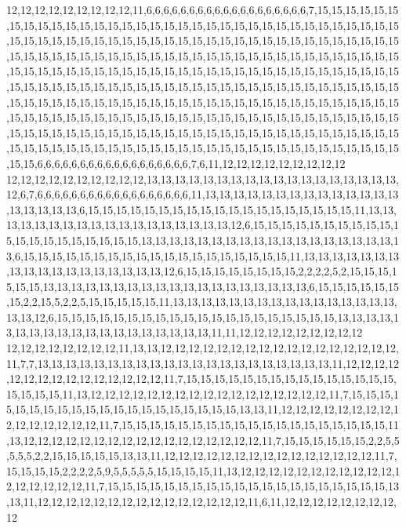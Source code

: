 12,12,12,12,12,12,12,12,12,11,6,6,6,6,6,6,6,6,6,6,6,6,6,6,6,6,6,6,6,7,15,15,15,15,15,15,15,15,15,15,15,15,15,15,15,15,15,15,15,15,15,15,15,15,15,15,15,15,15,15,15,15,15,15,15,15,15,15,15,15,15,15,15,15,15,15,15,15,15,15,15,15,15,15,15,15,15,15,15,15,15,15,15,15,15,15,15,15,15,15,15,15,15,15,15,15,15,15,15,15,15,15,15,15,15,15,15,15,15,15,15,15,15,15,15,15,15,15,15,15,15,15,15,15,15,15,15,15,15,15,15,15,15,15,15,15,15,15,15,15,15,15,15,15,15,15,15,15,15,15,15,15,15,15,15,15,15,15,15,15,15,15,15,15,15,15,15,15,15,15,15,15,15,15,15,15,15,15,15,15,15,15,15,15,15,15,15,15,15,15,15,15,15,15,15,15,15,15,15,15,15,15,15,15,15,15,15,15,15,15,15,15,15,15,15,15,15,15,15,15,15,15,15,15,15,15,15,15,15,15,15,15,15,15,15,15,15,15,15,15,15,15,15,15,15,15,15,15,15,15,15,15,15,15,15,15,15,15,15,15,15,15,15,15,15,15,15,15,15,15,15,15,15,15,15,15,15,15,15,15,6,6,6,6,6,6,6,6,6,6,6,6,6,6,6,6,6,6,7,6,11,12,12,12,12,12,12,12,12,12
12,12,12,12,12,12,12,12,12,12,13,13,13,13,13,13,13,13,13,13,13,13,13,13,13,13,13,13,12,6,7,6,6,6,6,6,6,6,6,6,6,6,6,6,6,6,6,6,6,11,13,13,13,13,13,13,13,13,13,13,13,13,13,13,13,13,13,13,13,6,15,15,15,15,15,15,15,15,15,15,15,15,15,15,15,15,15,15,15,11,13,13,13,13,13,13,13,13,13,13,13,13,13,13,13,13,13,13,12,6,15,15,15,15,15,15,15,15,15,15,15,15,15,15,15,15,15,15,15,15,13,13,13,13,13,13,13,13,13,13,13,13,13,13,13,13,13,13,13,6,15,15,15,15,15,15,15,15,15,15,15,15,15,15,15,15,15,15,15,11,13,13,13,13,13,13,13,13,13,13,13,13,13,13,13,13,13,13,12,6,15,15,15,15,15,15,15,15,2,2,2,2,5,2,15,15,15,15,15,15,13,13,13,13,13,13,13,13,13,13,13,13,13,13,13,13,13,13,13,6,15,15,15,15,15,15,15,2,2,15,5,2,2,5,15,15,15,15,15,11,13,13,13,13,13,13,13,13,13,13,13,13,13,13,13,13,13,13,12,6,15,15,15,15,15,15,15,15,15,15,15,15,15,15,15,15,15,15,15,15,13,13,13,13,13,13,13,13,13,13,13,13,13,13,13,13,13,13,13,11,11,12,12,12,12,12,12,12,12,12
12,12,12,12,12,12,12,12,11,13,13,12,12,12,12,12,12,12,12,12,12,12,12,12,12,12,12,12,11,7,7,13,13,13,13,13,13,13,13,13,13,13,13,13,13,13,13,13,13,13,13,13,11,12,12,12,12,12,12,12,12,12,12,12,12,12,12,12,11,7,15,15,15,15,15,15,15,15,15,15,15,15,15,15,15,15,15,15,15,11,13,12,12,12,12,12,12,12,12,12,12,12,12,12,12,12,12,12,11,7,15,15,15,15,15,15,15,15,15,15,15,15,15,15,15,15,15,15,15,15,13,13,11,12,12,12,12,12,12,12,12,12,12,12,12,12,12,12,11,7,15,15,15,15,15,15,15,15,15,15,15,15,15,15,15,15,15,15,15,11,13,12,12,12,12,12,12,12,12,12,12,12,12,12,12,12,12,12,11,7,15,15,15,15,15,15,2,2,5,5,5,5,5,2,2,15,15,15,15,15,13,13,11,12,12,12,12,12,12,12,12,12,12,12,12,12,12,12,11,7,15,15,15,15,2,2,2,2,5,9,5,5,5,5,5,15,15,15,15,11,13,12,12,12,12,12,12,12,12,12,12,12,12,12,12,12,12,12,11,7,15,15,15,15,15,15,15,15,15,15,15,15,15,15,15,15,15,15,15,15,13,13,11,12,12,12,12,12,12,12,12,12,12,12,12,12,12,12,11,6,11,12,12,12,12,12,12,12,12,12
